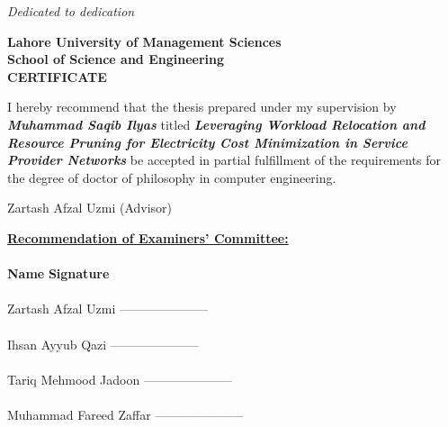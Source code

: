 \newpage
\thispagestyle{empty}
\begin{center}
 \vspace*{3in}
  \textit{\LARGE {Dedicated to dedication}}\\

\end{center}

\newpage
\thispagestyle{empty}
\begin{center}
  \vspace*{0.8cm}
\textbf{\Large Lahore University of Management Sciences}\\
\vspace*{0.8cm} \textbf{\large School of Science and
Engineering}\\\vspace*{0.8cm} \textbf{\large CERTIFICATE}
\end{center}
\vspace*{0.5cm}I hereby recommend that the thesis prepared under my
supervision by \textbf{\textit{Muhammad Saqib Ilyas}} titled
\textbf{\textit{Leveraging Workload Relocation and Resource Pruning for Electricity Cost Minimization in Service Provider Networks}} be accepted in partial fulfillment of the requirements for the degree of doctor of philosophy in computer engineering.\vspace{0.3in}
\begin{flushright}
Zartash Afzal Uzmi (Advisor) \end{flushright}
\textbf{\underline{Recommendation of Examiners' Committee:}}\\
\\\textbf{Name} \hspace*{5.5cm} \textbf{Signature}\\ \\
Zartash Afzal Uzmi \hspace*{2.7cm} {---------------------}\\\\
Ihsan Ayyub Qazi \hspace*{3.0cm} {---------------------}\\\\
Tariq Mehmood Jadoon\hspace*{2.1cm} {---------------------}\\\\
Muhammad Fareed Zaffar\hspace*{1.8cm} {---------------------}

